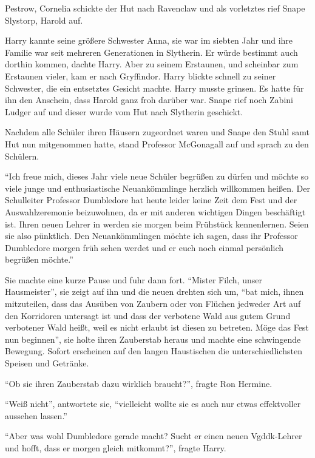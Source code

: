 Pestrow, Cornelia schickte der Hut nach Ravenclaw und als vorletztes rief Snape Slystorp, Harold auf.

Harry kannte seine größere Schwester Anna, sie war im siebten Jahr und ihre Familie war seit mehreren Generationen in Slytherin. Er würde bestimmt auch dorthin kommen, dachte Harry. Aber zu seinem Erstaunen, und scheinbar zum Erstaunen vieler, kam er nach Gryffindor. Harry blickte schnell zu seiner Schwester, die ein entsetztes Gesicht machte. Harry musste grinsen. Es hatte für ihn den Anschein, dass Harold ganz froh darüber war. Snape rief noch Zabini Ludger auf und dieser wurde vom Hut nach Slytherin geschickt.

Nachdem alle Schüler ihren Häusern zugeordnet waren und Snape den Stuhl samt Hut nun mitgenommen hatte, stand Professor McGonagall auf und sprach zu den Schülern.

\enquote{Ich freue mich, dieses Jahr viele neue Schüler begrüßen zu dürfen und möchte so viele junge und enthusiastische Neuankömmlinge herzlich willkommen heißen. Der Schulleiter Professor Dumbledore hat heute leider keine Zeit dem Fest und der Auswahlzeremonie beizuwohnen, da er mit anderen wichtigen Dingen beschäftigt ist. Ihren neuen Lehrer in \VgddK werden sie morgen beim Frühstück kennenlernen. Seien sie also pünktlich. Den Neuankömmlingen möchte ich sagen, dass ihr Professor Dumbledore morgen früh sehen werdet und er euch noch einmal persönlich begrüßen möchte.}

Sie machte eine kurze Pause und fuhr dann fort. \enquote{Mister Filch, unser Hausmeister}, sie zeigt auf ihn und die neuen drehten sich um, \enquote{bat mich, ihnen mitzuteilen, dass das Ausüben von Zaubern oder von Flüchen jedweder Art auf den Korridoren untersagt ist und dass der verbotene Wald aus gutem Grund verbotener Wald heißt, weil es nicht erlaubt ist diesen zu betreten. Möge das Fest nun beginnen}, sie holte ihren Zauberstab heraus und machte eine schwingende Bewegung. Sofort erscheinen auf den langen Haustischen die unterschiedlichsten Speisen und Getränke.

\enquote{Ob sie ihren Zauberstab dazu wirklich braucht?}, fragte Ron Hermine.

\enquote{Weiß nicht}, antwortete sie, \enquote{vielleicht wollte sie es auch nur etwas effektvoller aussehen lassen.}

\enquote{Aber was wohl Dumbledore gerade macht? Sucht er einen neuen Vgddk-Lehrer und hofft, dass er morgen gleich mitkommt?}, fragte Harry.

